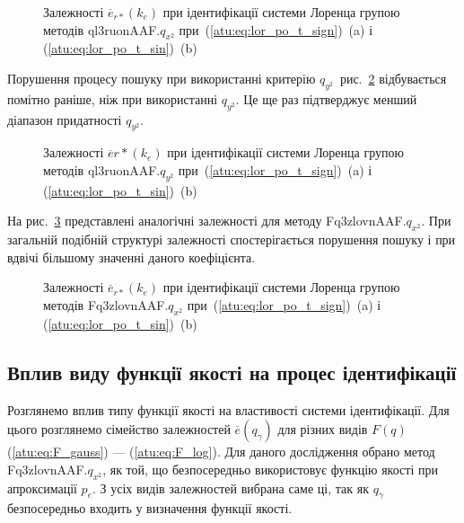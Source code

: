 \begin{figure}[htb!]
  \caption{Залежності $\overline{e}_{r *}(k_e)$ при ідентифікації системи Лоренца групою методів ql3ruonAAF.$q_{x^2}$ при~(\ref{atu:eq:lor_po_t_sign})~(a) і (\ref{atu:eq:lor_po_t_sin})~(b)}
  \label{atu:f:lor_ke_ql3ruonAAF.q_x2}
\end{figure}

Порушення процесу пошуку при використанні критерію
$q_{y^2}$~рис.~\ref{atu:f:lor_ke_ql3ruonAAF.q_y2} відбувається помітно раніше,
ніж при використанні
$q_{y^2}$. Це ще раз підтверджує менший діапазон придатності
$q_{y^2}$.

\begin{figure}[htb!]
  \caption{Залежності $ \overline{e}{r *}(k_e)$ при ідентифікації системи Лоренца групою методів ql3ruonAAF.$q_{y^2} $ при~(\ref{atu:eq:lor_po_t_sign})~(a) і (\ref{atu:eq:lor_po_t_sin})~(b)}
  \label{atu:f:lor_ke_ql3ruonAAF.q_y2}
\end{figure}

На рис.~\ref{atu:f:lor_ke_Fq3zlovnAAF.q_x2} представлені аналогічні залежності
для методу Fq3zlovnAAF.$q_{x^2} $. При загальній подібній структурі залежності
спостерігається порушення пошуку і при вдвічі більшому значенні
даного коефіцієнта.

\begin{figure}[htb!]
  \caption{Залежності $ \overline{e}_{r *}(k_e)$ при ідентифікації системи Лоренца групою методів Fq3zlovnAAF.$q_{x^2} $ при~(\ref{atu:eq:lor_po_t_sign})~(a) і (\ref{atu:eq:lor_po_t_sin})~(b)}
  \label{atu:f:lor_ke_Fq3zlovnAAF.q_x2}
\end{figure}





\subsection{Вплив виду функції якості на процес ідентифікації}%

Розглянемо вплив типу функції якості на властивості системи
ідентифікації. Для цього розглянемо сімейство залежностей
$\overline{e}(q_\gamma) $ для різних видів
$F (q) $ (\ref{atu:eq:F_gauss}) --- (\ref{atu:eq:F_log}). Для даного дослідження обрано
метод Fq3zlovnAAF.$q_{x^2} $, як той, що безпосередньо використовує функцію якості при
апроксимації $ p_e $. З усіх видів залежностей вибрана саме ці, так як
$q_\gamma $ безпосередньо входить у визначення функції якості.


